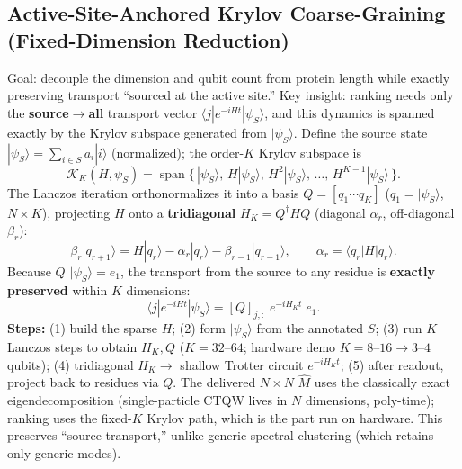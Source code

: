 \documentclass[11pt,a4paper]{article}
\newcommand{\mhat}{\hat{M}}
\newcommand{\lead}[1]{\textbf{#1}}
\newcommand{\note}[1]{{\color{grey}\small #1}}
\begin{document}
\subsection{Active-Site-Anchored Krylov Coarse-Graining (Fixed-Dimension Reduction)}
Goal: decouple the dimension and qubit count from protein length while exactly preserving transport ``sourced at the active site.'' Key insight: ranking needs only the \lead{source$\rightarrow$all} transport vector $\langle j|e^{-iHt}|\psi_S\rangle$, and this dynamics is spanned exactly by the Krylov subspace generated from $|\psi_S\rangle$. Define the source state $|\psi_S\rangle=\sum_{i\in S}a_i|i\rangle$ (normalized); the order-$K$ Krylov subspace is
\begin{equation*}
\mathcal{K}_K(H,\psi_S)=\operatorname{span}\{\,|\psi_S\rangle,\,H|\psi_S\rangle,\,H^2|\psi_S\rangle,\,\ldots,\,H^{K-1}|\psi_S\rangle\,\}.
\end{equation*}
The Lanczos iteration orthonormalizes it into a basis $Q=[q_1\cdots q_K]$ ($q_1=|\psi_S\rangle$, $N\times K$), projecting $H$ onto a \lead{tridiagonal} $H_K=Q^{\dagger}HQ$ (diagonal $\alpha_r$, off-diagonal $\beta_r$):
\begin{equation*}
\beta_r|q_{r+1}\rangle = H|q_r\rangle-\alpha_r|q_r\rangle-\beta_{r-1}|q_{r-1}\rangle,\qquad \alpha_r=\langle q_r|H|q_r\rangle .
\end{equation*}
Because $Q^{\dagger}|\psi_S\rangle=e_1$, the transport from the source to any residue is \lead{exactly preserved} within $K$ dimensions:
\begin{equation*}
\langle j|e^{-iHt}|\psi_S\rangle = [Q]_{j,:}\;e^{-iH_K t}\;e_1 .
\end{equation*}
\lead{Steps:} (1) build the sparse $H$; (2) form $|\psi_S\rangle$ from the annotated $S$; (3) run $K$ Lanczos steps to obtain $H_K,Q$ ($K=32$--$64$; hardware demo $K=8$--$16 \rightarrow 3$--$4$ qubits); (4) tridiagonal $H_K\rightarrow$ shallow Trotter circuit $e^{-iH_K t}$; (5) after readout, project back to residues via $Q$. \note{The delivered $N\times N$ $\mhat$ uses the classically exact eigendecomposition (single-particle CTQW lives in $N$ dimensions, poly-time); ranking uses the fixed-$K$ Krylov path, which is the part run on hardware. This preserves ``source transport,'' unlike generic spectral clustering (which retains only generic modes).}
\end{document}
